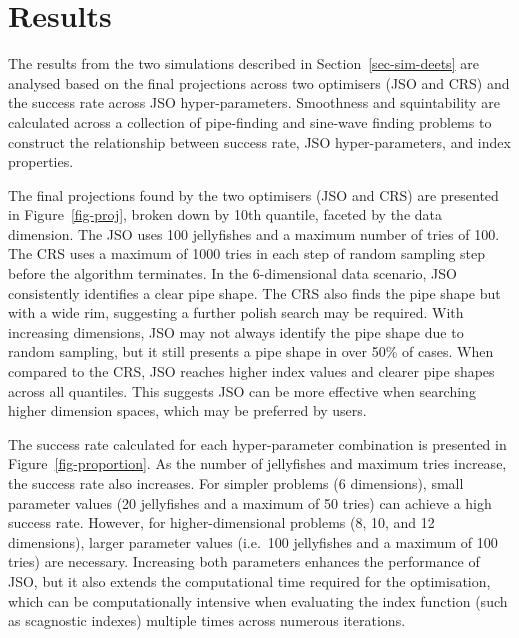 \documentclass[
  number,
  preprint,
  3p]{elsarticle}
\begin{document}
\section{Results}\label{sec-sim-res}

The results from the two simulations described in
Section~\ref{sec-sim-deets} are analysed based on the final projections
across two optimisers (JSO and CRS) and the success rate across JSO
hyper-parameters. Smoothness and squintability are calculated across a
collection of pipe-finding and sine-wave finding problems to construct
the relationship between success rate, JSO hyper-parameters, and index
properties.

The final projections found by the two optimisers (JSO and CRS) are
presented in Figure~\ref{fig-proj}, broken down by 10th quantile,
faceted by the data dimension. The JSO uses 100 jellyfishes and a
maximum number of tries of 100. The CRS uses a maximum of 1000 tries in
each step of random sampling step before the algorithm terminates. In
the 6-dimensional data scenario, JSO consistently identifies a clear
pipe shape. The CRS also finds the pipe shape but with a wide rim,
suggesting a further polish search may be required. With increasing
dimensions, JSO may not always identify the pipe shape due to random
sampling, but it still presents a pipe shape in over 50\% of cases. When
compared to the CRS, JSO reaches higher index values and clearer pipe
shapes across all quantiles. This suggests JSO can be more effective
when searching higher dimension spaces, which may be preferred by users.

The success rate calculated for each hyper-parameter combination is
presented in Figure~\ref{fig-proportion}. As the number of jellyfishes
and maximum tries increase, the success rate also increases. For simpler
problems (6 dimensions), small parameter values (20 jellyfishes and a
maximum of 50 tries) can achieve a high success rate. However, for
higher-dimensional problems (8, 10, and 12 dimensions), larger parameter
values (i.e.~100 jellyfishes and a maximum of 100 tries) are necessary.
Increasing both parameters enhances the performance of JSO, but it also
extends the computational time required for the optimisation, which can
be computationally intensive when evaluating the index function (such as
scagnostic indexes) multiple times across numerous iterations.
\end{document}
